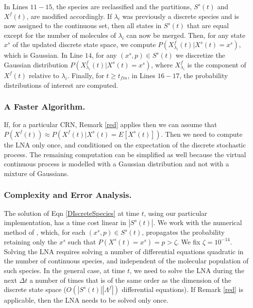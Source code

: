 \documentclass{llncs}
\begin{document}
In Lines $11-15$, the species are reclassified and the partitions, $S^s(t)$ and $X^f(t)$, are modified accordingly. If $\lambda_i$  was previously a discrete species and is now assigned to the continuous set, then all states in $S^s(t)$ that are equal except for the number of molecules of $\lambda_i$ can now be merged. %
Then, for any state $x^s$ of the updated discrete state space, we compute $P(X^f_{\lambda_i}(t)|X^s(t)=x^s)$, which is Gaussian. In Line $14$, for any $(x^s,p) \in S^s(t)$ we discretize the Gaussian distribution $P(X^f_{\lambda_i}(t)|X^s(t)=x^s)$, where $X^f_{\lambda_i}$ is the component of $X^f(t)$ relative to $\lambda_i$.
Finally, for $t\geq t_{fin}$, in Lines $16-17$, the probability distributions of interest are computed.

\subsubsection{A Faster Algorithm.}
If, for a particular CRN, Remark \ref{red} applies then we can assume that $P(X^f(t))\approx P(X^f(t)|X^s(t)=E[X^s(t)])$.
Then we need to compute the LNA only once, and conditioned on the expectation of the discrete stochastic process.  
The remaining computation can be simplified as well because the virtual continuous process is modelled with a Gaussian distribution and not with a mixture of Gaussians.

\subsubsection{Complexity and Error Analysis.}
The solution of Eqn \eqref{DIscreteSpecies} at time $t$, using our particular implementation, has a time cost linear in $|S^s(t)|$. We work with the numerical method of \cite{henzinger2010hybrid}, which, for each $(x^s,p)\in S^s(t)$, propagates the probability retaining only the $x^s$ such that $P(X^s(t)=x^s)=p>\zeta$. We fix $\zeta=10^{-14}$. %
Solving the LNA requires solving a number of differential equations quadratic in the number of continuous species, and independent of the molecular population of such species.
In the general case, at time $t$, we need to solve the LNA during the next $\Delta t$ a number of times that is of the same order as  the dimension of the discrete state space ($O(|S^s(t)||\Lambda^f|)$ differential equations). If Remark \ref{red} is applicable, then the LNA needs to be solved only once. 
\end{document}
